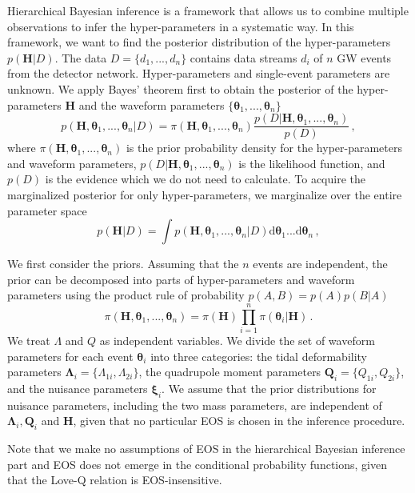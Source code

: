 \documentclass[a4paper,11pt]{article}
\begin{document}
Hierarchical Bayesian inference is a framework that allows us to combine multiple observations to infer the hyper-parameters in a systematic way. In this framework, we want to find the posterior distribution of the hyper-parameters $p(\bm{H}|D)$. The data $D=\{d_1,...,d_n\}$ contains data streams $d_i$ of $n$ GW events from the detector network. Hyper-parameters and single-event parameters are unknown. We apply Bayes' theorem first to obtain the posterior of the hyper-parameters $\bm{H}$ and the waveform parameters $\{\bm{\theta}_1,...,\bm{\theta}_n\}$
\begin{equation}
\label{bayes2}
p(\bm{H},\bm{\theta}_1,...,\bm{\theta}_n|D)=\pi(\bm{H},\bm{\theta}_1,...,\bm{\theta}_n)\frac{p(D|\bm{H},\bm{\theta}_1,...,\bm{\theta}_n)}{p(D)}\,,
\end{equation}
where $\pi(\bm{H},\bm{\theta}_1,...,\bm{\theta}_n)$ is the prior probability density for the hyper-parameters and waveform parameters, $p(D|\bm{H},\bm{\theta}_1,...,\bm{\theta}_n)$ is the likelihood function, and $p(D)$ is the evidence which we do not need to calculate. To acquire the marginalized posterior for only hyper-parameters, we marginalize over the entire parameter space
\begin{equation}
\label{bayes1}
p(\bm{H}|D) = \int p(\bm{H},\bm{\theta}_1,...,\bm{\theta}_n|D) \text{d}\bm{\theta}_1...\text{d}\bm{\theta}_n\,,
\end{equation}

We first consider the priors. Assuming that the $n$ events are independent, the prior can be decomposed into parts of hyper-parameters and waveform parameters using the product rule of probability $p(A,B)=p(A)p(B|A)$
\begin{equation}
\label{bayes3}
\pi(\bm{H},\bm{\theta}_1,...,\bm{\theta}_n) = \pi(\bm{H}) \prod_{i=1}^n \pi(\bm{\theta}_i|\bm{H})\,.
\end{equation}
We treat $\Lambda$ and $Q$ as independent variables. We divide the set of waveform parameters for each event $\bm{\theta}_i$ into three categories: the tidal deformability parameters $\bm{\Lambda}_i=\{\Lambda_{1i},\Lambda_{2i}\}$, the quadrupole moment parameters $\bm{Q}_i=\{Q_{1i},Q_{2i}\}$, and the nuisance parameters $\bm{\xi}_i$. We assume that the prior distributions for nuisance parameters, including the two mass parameters, are independent of $\bm{\Lambda}_i, \bm{Q}_i$ and $\bm{H}$, given that no particular EOS is chosen in the inference procedure. 

Note that we make no assumptions of EOS in the hierarchical Bayesian inference part and EOS does not emerge in the conditional probability functions, given that the Love-Q relation is EOS-insensitive. 
\end{document}
